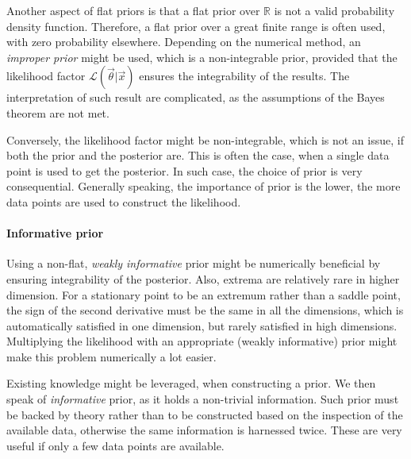 Another aspect of flat priors is that a flat prior over $\mathbb{R}$ is not a valid probability density function. Therefore, a flat prior over a great finite range is often used, with zero probability elsewhere. Depending on the numerical method, an \textit{improper prior} might be used, which is a non-integrable prior, provided that the likelihood factor $\mathcal{L}(\vec{\theta}|\vec{x})$ ensures the integrability of the results. The interpretation of such result are complicated, as the assumptions of the Bayes theorem are not met. 

Conversely, the likelihood factor might be non-integrable, which is not an issue, if both the prior and the posterior are. This is often the case, when a single data point is used to get the posterior. In such case, the choice of prior is very consequential. Generally speaking, the importance of prior is the lower, the more data points are used to construct the likelihood.

\paragraph{Informative prior} Using a non-flat, \textit{weakly informative} prior might be numerically beneficial by ensuring integrability of the posterior. Also, extrema are relatively rare in higher dimension. For a stationary point to be an extremum rather than a saddle point, the sign of the second derivative must be the same in all the dimensions, which is automatically satisfied in one dimension, but rarely satisfied in high dimensions. Multiplying the likelihood with an appropriate (weakly informative) prior might make this problem numerically a lot easier. 

Existing knowledge might be leveraged, when constructing a prior. We then speak of \textit{informative} prior, as it holds a non-trivial information. Such prior must be backed by theory rather than to be constructed based on the inspection of the available data, otherwise the same information is harnessed twice. These are very useful if only a few data points are available.









